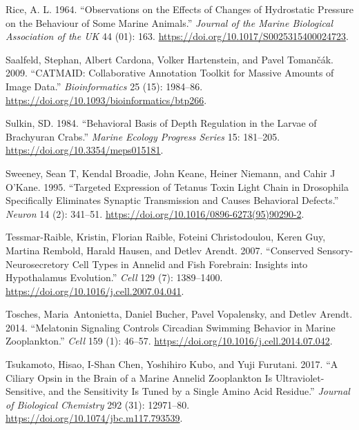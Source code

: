 \documentclass[
]{article}
\newlength{\cslhangindent}
\newlength{\cslentryspacingunit} %
\newenvironment{CSLReferences}[2] %
 {%
  \setlength{\parindent}{0pt}
  \ifodd #1
  \let\oldpar\par
  \def\par{\hangindent=\cslhangindent\oldpar}
  \fi
  \setlength{\parskip}{#2\cslentryspacingunit}
 }%
 {}
\begin{document}
\begin{CSLReferences}{1}{0}
\leavevmode{}%
Rice, A. L. 1964. {``Observations on the Effects of Changes of
Hydrostatic Pressure on the Behaviour of Some Marine Animals.''}
\emph{Journal of the Marine Biological Association of the {UK}} 44 (01):
163. \url{https://doi.org/10.1017/S0025315400024723}.

\leavevmode{}%
Saalfeld, Stephan, Albert Cardona, Volker Hartenstein, and Pavel
Tomančák. 2009. {``CATMAID: Collaborative Annotation Toolkit for Massive
Amounts of Image Data.''} \emph{Bioinformatics} 25 (15): 1984--86.
\url{https://doi.org/10.1093/bioinformatics/btp266}.

\leavevmode{}%
Sulkin, SD. 1984. {``Behavioral Basis of Depth Regulation in the Larvae
of Brachyuran Crabs.''} \emph{Marine Ecology Progress Series} 15:
181--205. \url{https://doi.org/10.3354/meps015181}.

\leavevmode{}%
Sweeney, Sean T, Kendal Broadie, John Keane, Heiner Niemann, and Cahir J
O'Kane. 1995. {``Targeted Expression of Tetanus Toxin Light Chain in
Drosophila Specifically Eliminates Synaptic Transmission and Causes
Behavioral Defects.''} \emph{Neuron} 14 (2): 341--51.
\url{https://doi.org/10.1016/0896-6273(95)90290-2}.

\leavevmode{}%
Tessmar-Raible, Kristin, Florian Raible, Foteini Christodoulou, Keren
Guy, Martina Rembold, Harald Hausen, and Detlev Arendt. 2007.
{``Conserved Sensory-Neurosecretory Cell Types in Annelid and Fish
Forebrain: Insights into Hypothalamus Evolution.''} \emph{Cell} 129 (7):
1389--1400. \url{https://doi.org/10.1016/j.cell.2007.04.041}.

\leavevmode{}%
Tosches, Maria~Antonietta, Daniel Bucher, Pavel Vopalensky, and Detlev
Arendt. 2014. {``Melatonin Signaling Controls Circadian Swimming
Behavior in Marine Zooplankton.''} \emph{Cell} 159 (1): 46--57.
\url{https://doi.org/10.1016/j.cell.2014.07.042}.

\leavevmode{}%
Tsukamoto, Hisao, I-Shan Chen, Yoshihiro Kubo, and Yuji Furutani. 2017.
{``A Ciliary Opsin in the Brain of a Marine Annelid Zooplankton Is
Ultraviolet-Sensitive, and the Sensitivity Is Tuned by a Single Amino
Acid Residue.''} \emph{Journal of Biological Chemistry} 292 (31):
12971--80. \url{https://doi.org/10.1074/jbc.m117.793539}.


\end{CSLReferences}
\end{document}
